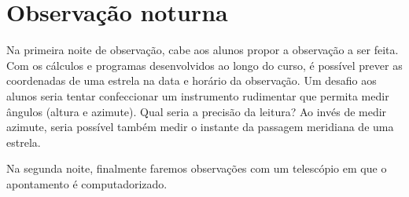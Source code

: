 \chapter{Observação noturna}

Na primeira noite de observação, cabe aos alunos propor a observação a ser feita. Com os cálculos e programas desenvolvidos ao longo do curso, é possível prever as coordenadas de uma estrela na data e horário da observação. Um desafio aos alunos seria tentar confeccionar um instrumento rudimentar que permita medir ângulos (altura e azimute). Qual seria a precisão da leitura? Ao invés de medir azimute, seria possível também medir o instante da passagem meridiana de uma estrela.

Na segunda noite, finalmente faremos observações com um telescópio em que o apontamento é computadorizado.

